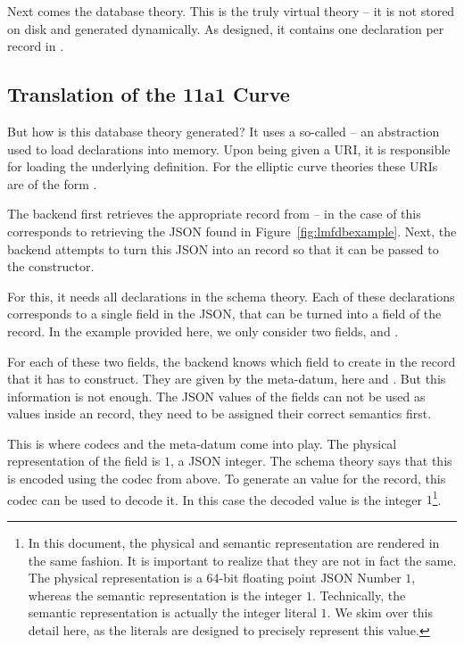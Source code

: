 Next comes the database theory. 
This is the truly virtual theory -- it is not stored on disk and generated dynamically. 
As designed, it contains one declaration per record in \lmfdb. 

\subsection{Translation of the 11a1 Curve}\label{sec:vt:11a1}

But how is this database theory generated?
It uses a so-called  -- an \mmt abstraction used to load declarations into memory. 
Upon being given a URI, it is responsible for loading the underlying definition.
For the elliptic curve theories these URIs are of the form . 

The backend first retrieves the appropriate record from \lmfdb -- in the case of  this corresponds to retrieving the JSON found in Figure~\ref{fig:lmfdbexample}. 
Next, the backend attempts to turn this JSON into an \mmt record so that it can be passed to the  constructor. 

For this, it needs all declarations in the schema theory. 
Each of these declarations corresponds to a single field in the JSON, that can be turned into a field of the \mmt record. 
In the example provided here, we only consider two fields,  and . 

For each of these two fields, the backend knows which field to create in the \mmt record that it has to construct. 
They are given by the  meta-datum, here  and . 
But this information is not enough. 
The JSON values of the fields can not be used as values inside an \mmt record, they need to be assigned their correct semantics first. 

This is where codecs and the  meta-datum come into play. 
The physical representation of the  field is $1$, a JSON integer. 
The schema theory says that this is encoded using the  codec from above. 
To generate an \mmt value for the record, this codec can be used to decode it. 
In this case the decoded value is the integer $1$\footnote{
  In this document, the physical and semantic representation are rendered in the same fashion. 
  It is important to realize that they are not in fact the same. 
  The physical representation is a 64-bit floating point JSON Number $1$, whereas the semantic representation is the integer $1$. 
  Technically, the semantic representation is actually the \ommt integer literal $1$. 
  We skim over this detail here, as the \ommt literals are designed to precisely represent this value. 
}. 

